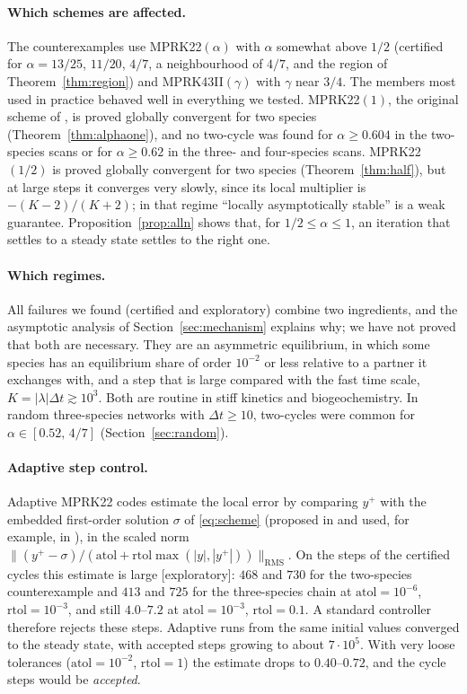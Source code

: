 \documentclass[11pt,a4paper]{article}
\theoremstyle{plain}
\theoremstyle{definition}
\newcommand{\status}[1]{\textsf{[#1]}}
\begin{document}
\paragraph{Which schemes are affected.} The counterexamples use MPRK22$(\alpha)$ with $\alpha$ somewhat above $1/2$ (certified for $\alpha=13/25$, $11/20$, $4/7$, a neighbourhood of $4/7$, and the region of Theorem~\ref{thm:region}) and MPRK43II$(\gamma)$ with $\gamma$ near $3/4$. The members most used in practice behaved well in everything we tested. MPRK22$(1)$, the original scheme of \cite{BDM2003}, is proved globally convergent for two species (Theorem~\ref{thm:alphaone}), and no two-cycle was found for $\alpha\ge0.604$ in the two-species scans or for $\alpha\ge0.62$ in the three- and four-species scans. MPRK22$(1/2)$ is proved globally convergent for two species (Theorem~\ref{thm:half}), but at large steps it converges very slowly, since its local multiplier is $-(K-2)/(K+2)$; in that regime ``locally asymptotically stable'' is a weak guarantee. Proposition~\ref{prop:alln} shows that, for $1/2\le\alpha\le1$, an iteration that settles to a steady state settles to the right one.

\paragraph{Which regimes.} All failures we found (certified and exploratory) combine two ingredients, and the asymptotic analysis of Section~\ref{sec:mechanism} explains why; we have not proved that both are necessary. They are an asymmetric equilibrium, in which some species has an equilibrium share of order $10^{-2}$ or less relative to a partner it exchanges with, and a step that is large compared with the fast time scale, $K=|\lambda|\Delta t\gtrsim10^3$. Both are routine in stiff kinetics and biogeochemistry. In random three-species networks with $\Delta t\ge10$, two-cycles were common for $\alpha\in[0.52,\,4/7]$ (Section~\ref{sec:random}).

\paragraph{Adaptive step control.} Adaptive MPRK22 codes estimate the local error by comparing $y^+$ with the embedded first-order solution $\sigma$ of \eqref{eq:scheme} (proposed in \cite{KM2018a} and used, for example, in \cite{PosInt}), in the scaled norm $\bigl\|(y^+-\sigma)/(\mathrm{atol}+\mathrm{rtol}\max(|y|,|y^+|))\bigr\|_{\mathrm{RMS}}$. On the steps of the certified cycles this estimate is large \status{exploratory}: $468$ and $730$ for the two-species counterexample and $413$ and $725$ for the three-species chain at $\mathrm{atol}=10^{-6}$, $\mathrm{rtol}=10^{-3}$, and still $4.0$--$7.2$ at $\mathrm{atol}=10^{-3}$, $\mathrm{rtol}=0.1$. A standard controller therefore rejects these steps. Adaptive runs from the same initial values converged to the steady state, with accepted steps growing to about $7\cdot10^5$. With very loose tolerances ($\mathrm{atol}=10^{-2}$, $\mathrm{rtol}=1$) the estimate drops to $0.40$--$0.72$, and the cycle steps would be \emph{accepted}.
\end{document}
